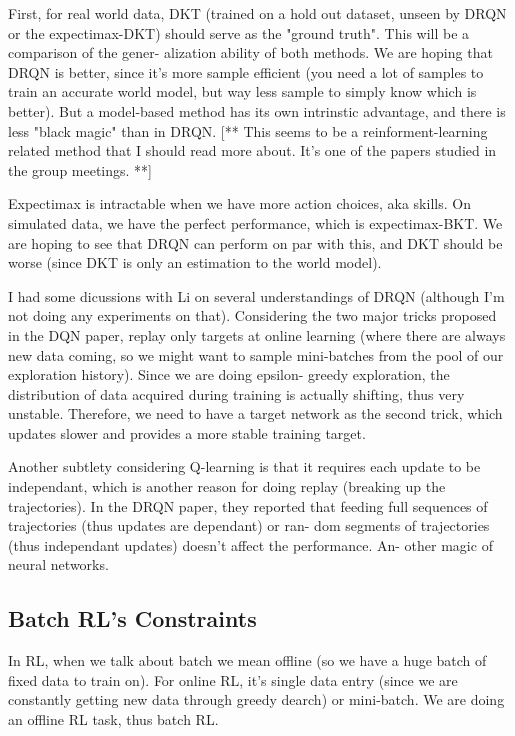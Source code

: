 First, for real world data, DKT (trained on a hold out dataset, unseen by DRQN or the expectimax-DKT) should serve as the "ground truth". This will be a comparison of the gener- alization ability of both methods. We are hoping that DRQN is better, since it’s more sample efficient (you need a lot of samples to train an accurate world model, but way less sample to simply know which is better). But a model-based method has its own intrinstic advantage, and there is less "black magic" than in DRQN. [** This seems to be a reinforment-learning related method that I should read more about. It’s one of the papers studied in the group meetings. **]

Expectimax is intractable when we have more action choices, aka skills. On simulated data, we have the perfect performance, which is expectimax-BKT. We are hoping to see that DRQN can perform on par with this, and DKT should be worse (since DKT is only an estimation to the world model).


I had some dicussions with Li on several understandings of DRQN (although I’m not doing any experiments on that). Considering the two major tricks proposed in the DQN paper, replay only targets at online learning (where there are always new data coming, so we might want to sample mini-batches from the pool of our exploration history). Since we are doing epsilon- greedy exploration, the distribution of data acquired during training is actually shifting, thus very unstable. Therefore, we need to have a target network as the second trick, which updates slower and provides a more stable training target.

Another subtlety considering Q-learning is that it requires each update to be independant, which is another reason for doing replay (breaking up the trajectories). In the DRQN paper, they reported that feeding full sequences of trajectories (thus updates are dependant) or ran- dom segments of trajectories (thus independant updates) doesn’t affect the performance. An- other magic of neural networks.

\subsection{Batch RL's Constraints}

In RL, when we talk about batch we mean offline (so we have a huge batch of fixed data to train on). For online RL, it’s single data entry (since we are constantly getting new data through greedy dearch) or mini-batch. We are doing an offline RL task, thus batch RL.


